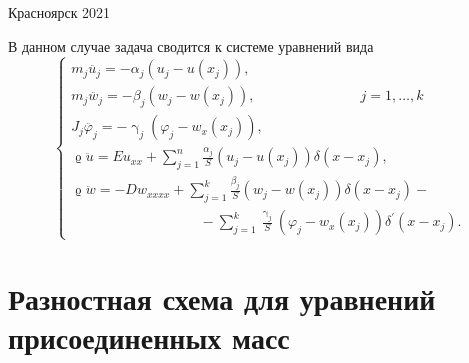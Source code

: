 \documentclass[a4paper,14pt,russian]{extreport}
\numberwithin{figure}{section}
\begin{document}
\vspace{\fill}

\begin{center}
Красноярск 2021
\end{center}
\pagestyle{empty}
\newpage


\clearpage%
\pagestyle{empty}
\setlength{\cftbeforetoctitleskip}{-85pt}
\setlength{\cftaftertoctitleskip}{-20pt}

\renewcommand{\contentsname}{\centering \section*{\normalsize СОДЕРЖАНИЕ}}

\tableofcontents
\newpage
%
\pagestyle{plain}
\renewcommand{\@evenfoot}{\hfil\thepage\hfil}
\renewcommand{\@oddfoot}{\hfil\thepage\hfil}
\renewcommand{\@evenhead}{}
\renewcommand{\@oddhead}{}
\setcounter{page}{3}


В данном случае задача сводится к системе уравнений вида
\begin{equation} 
 \begin{cases}
   m_j \ddot{u_j}=-\alpha_j(u_j-u(x_j)), \\
   m_j \ddot{w_j}=-\beta_j(w_j-w(x_j)),\;\;\;\;\;\;\;\;\;\;\;\;\;\;\;\;\;\;\;\;\;\;\;\;\;\;\;j=1, \dots, k\\
   J_j \ddot{\varphi_j}=-\upgamma_j(\varphi_j-w_x(x_j)),\\
   \upvarrho \ddot{u}=Eu_{xx}+\sum_{j=1}^n \frac {\alpha_j} {S}(u_j-u(x_j))\delta(x-x_j),\\
	\upvarrho \ddot{w}=-Dw_{xxxx}+\sum_{j=1}^k \frac {\beta_j} {S}(w_j-w(x_j))\delta(x-x_j)- \\
	\;\;\;\;\;\;\;\;\;\;\;\;\;\;\;\;\;\;\;\;\;\;\;\;\;\;\;\;\;\;\;\;\;-\sum_{j=1}^k \frac {\upgamma_j} {S}(\varphi_j-w_x(x_j))\delta^\prime(x-x_j).
 \end{cases}
\end{equation}
\section{Разностная схема для уравнений присоединенных масс}
\end{document}

